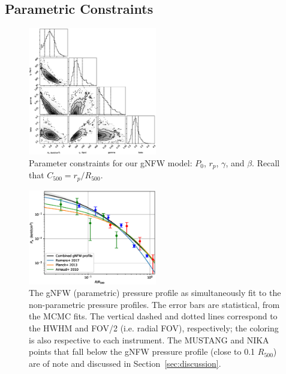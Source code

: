 \documentclass[twocolumn,traditabstract]{aa}
\begin{document}
\subsection{Parametric Constraints}

\begin{figure}[!h]
  \centering
  \includegraphics[width=0.5\textwidth]{NIKA_ml_deproj_figs/Real_Joint_gNFW_Real_11011111_2500S_500B_100W_contour_p16cosmo.eps}
  \caption{Parameter constraints for our gNFW model: $P_0$, $r_p$, $\gamma$, and $\beta$. Recall that $C_{500} = r_p / R_{500}$.}
  \label{fig:joint_constraints}
\end{figure}
\begin{figure}[!h]
  \centering
  \includegraphics[width=0.5\textwidth]{NIKA_ml_deproj_figs/Real_Joint_gNFW_Power_Real_11011111_2500S_500B_100W_gNFW_pressure_w_NP_pts_v2_p16cosmo.eps}
  \caption{The gNFW (parametric) pressure profile as simultaneously fit to the non-parametric pressure profiles.
    The error bars are statistical,
    from the MCMC fits. The vertical dashed and dotted
    lines correspond to the HWHM and FOV/2 (i.e. radial FOV), respectively; the coloring is also respective to each
    instrument. The MUSTANG and NIKA points that fall below the gNFW pressure profile (close to 0.1 $R_{500}$) are of
    note and discussed in Section~\ref{sec:discussion}.}
  \label{fig:joint_pressure}
\end{figure}
\end{document}
